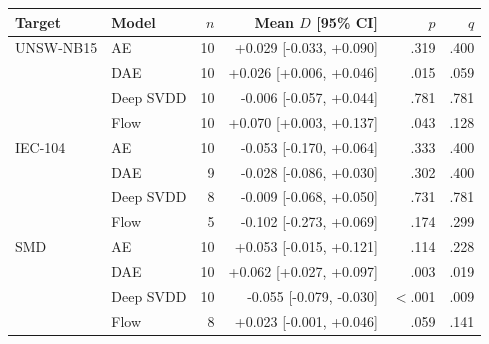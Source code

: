 \begin{tabular}{llrrrr}\toprule
Target & Model & $n$ & Mean $D$ [95\% CI] & $p$ & $q$\\\midrule
UNSW-NB15 & AE & 10 & +0.029 [-0.033, +0.090] & .319 & .400\\
 & DAE & 10 & +0.026 [+0.006, +0.046] & .015 & .059\\
 & Deep SVDD & 10 & -0.006 [-0.057, +0.044] & .781 & .781\\
 & Flow & 10 & +0.070 [+0.003, +0.137] & .043 & .128\\
\midrule
IEC-104 & AE & 10 & -0.053 [-0.170, +0.064] & .333 & .400\\
 & DAE & 9 & -0.028 [-0.086, +0.030] & .302 & .400\\
 & Deep SVDD & 8 & -0.009 [-0.068, +0.050] & .731 & .781\\
 & Flow & 5 & -0.102 [-0.273, +0.069] & .174 & .299\\
\midrule
SMD & AE & 10 & +0.053 [-0.015, +0.121] & .114 & .228\\
 & DAE & 10 & +0.062 [+0.027, +0.097] & .003 & .019\\
 & Deep SVDD & 10 & -0.055 [-0.079, -0.030] & $<$.001 & .009\\
 & Flow & 8 & +0.023 [-0.001, +0.046] & .059 & .141\\
\bottomrule\end{tabular}